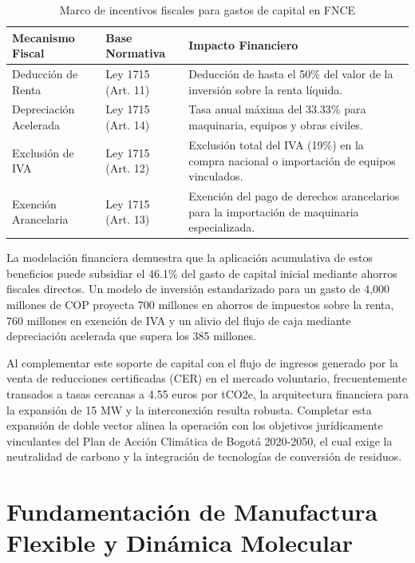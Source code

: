 \documentclass[11pt,letterpaper]{article}
\begin{document}
\begin{table}[htbp]
  \centering
  \caption{Marco de incentivos fiscales para gastos de capital en FNCE}
  \label{tab:incentivos}
  \begin{tabular}{llp{}}
    \toprule
    Mecanismo Fiscal & Base Normativa & Impacto Financiero \\
    \midrule
    Deducción de Renta & Ley 1715 (Art. 11) & Deducción de hasta el 50\% del
    valor de la inversión sobre la renta líquida. \\
    Depreciación Acelerada & Ley 1715 (Art. 14) & Tasa anual máxima del 33.33\%
    para maquinaria, equipos y obras civiles. \\
    Exclusión de IVA & Ley 1715 (Art. 12) & Exclusión total del IVA (19\%) en la
    compra nacional o importación de equipos vinculados. \\
    Exención Arancelaria & Ley 1715 (Art. 13) & Exención del pago de derechos
    arancelarios para la importación de maquinaria especializada. \\
    \bottomrule
  \end{tabular}
\end{table}

La modelación financiera demuestra que la aplicación acumulativa de estos
beneficios puede subsidiar el 46.1\% del gasto de capital inicial mediante
ahorros fiscales directos. Un modelo de inversión estandarizado para un gasto de
4,000 millones de COP proyecta 700 millones en ahorros de impuestos sobre la
renta, 760 millones en exención de IVA y un alivio del flujo de caja mediante
depreciación acelerada que supera los 385 millones.

Al complementar este soporte de capital con el flujo de ingresos generado por la
venta de reducciones certificadas (CER) en el mercado voluntario, frecuentemente
transados a tasas cercanas a 4.55 euros por tCO2e, la arquitectura financiera
para la expansión de 15 MW y la interconexión resulta robusta. Completar esta
expansión de doble vector alinea la operación con los objetivos jurídicamente
vinculantes del Plan de Acción Climática de Bogotá 2020-2050, el cual exige la
neutralidad de carbono y la integración de tecnologías de conversión de
residuos.

\newpage

\section{Fundamentación de Manufactura Flexible y Dinámica Molecular}
\end{document}
